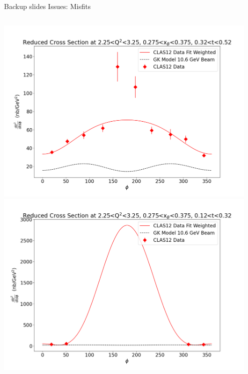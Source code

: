 \documentclass[aspectratio=169]{beamer}
\begin{document}
\begin{frame}{Backup slides}
\centering
Issues: Misfits\\
    \begin{columns}
             
 
    \includegraphics[width=0.95\textwidth]{DNP/misfit_1.png}
    \includegraphics[width=0.95\textwidth]{DNP/misfit_2.png}
       \end{columns}
\end{frame}
\end{document}

